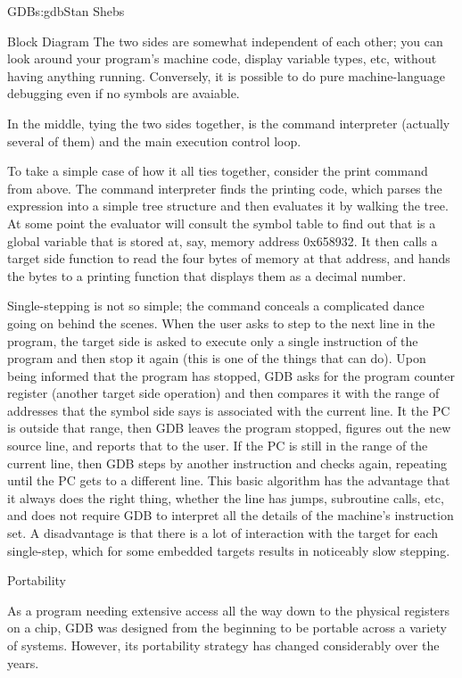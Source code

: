 \begin{aosachapter}{GDB}{s:gdb}{Stan Shebs}
\begin{aosasect1}{Block Diagram}
The two sides are somewhat independent of each other; you can look
around your program's machine code, display variable types, etc,
without having anything running.  Conversely, it is possible to do
pure machine-language debugging even if no symbols are avaiable.

In the middle, tying the two sides together, is the command
interpreter (actually several of them) and the main execution control
loop.

To take a simple case of how it all ties together, consider the print
command from above.  The command interpreter finds the printing code,
which parses the expression into a simple tree structure and then
evaluates it by walking the tree.  At some point the evaluator will
consult the symbol table to find out that  is a
global variable that is stored at, say, memory address 0x658932.  It
then calls a target side function to read the four bytes of memory at
that address, and hands the bytes to a printing function that displays
them as a decimal number.

Single-stepping is not so simple; the command  conceals a
complicated dance going on behind the scenes.  When the user asks to
step to the next line in the program, the target side is asked to
execute only a single instruction of the program and then stop it
again (this is one of the things that  can do).  Upon being
informed that the program has stopped, GDB asks for the program
counter register (another target side operation) and then compares it
with the range of addresses that the symbol side says is associated
with the current line.  It the PC is outside that range, then GDB
leaves the program stopped, figures out the new source line, and
reports that to the user.  If the PC is still in the range of the
current line, then GDB steps by another instruction and checks again,
repeating until the PC gets to a different line.  This basic algorithm
has the advantage that it always does the right thing, whether the
line has jumps, subroutine calls, etc, and does not require GDB to
interpret all the details of the machine's instruction set.  A
disadvantage is that there is a lot of interaction with the target for
each single-step, which for some embedded targets results in
noticeably slow stepping.

\end{aosasect1}

\begin{aosasect1}{Portability}

As a program needing extensive access all the way down to the physical
registers on a chip, GDB was designed from the beginning to be
portable across a variety of systems.  However, its portability
strategy has changed considerably over the years.


\end{aosasect1}
\end{aosachapter}
